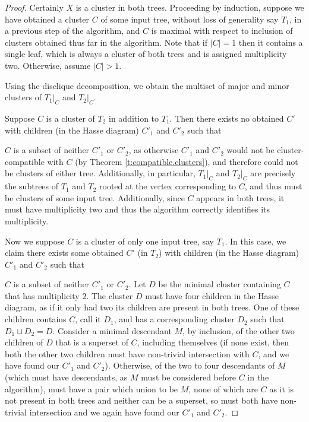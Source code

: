 \documentclass[12pt]{article}
\theoremstyle{definition}
\begin{document}
\begin{proof}
  Certainly $X$ is a cluster in both trees. Proceeding by induction, suppose we have obtained a cluster $C$ of some input tree, without loss of generality say $T_1$, in a previous step of the algorithm, and $C$ is maximal with respect to inclusion of clusters obtained thus far in the algorithm. Note that if $|C|=1$ then it contains a single leaf, which is always a cluster of both trees and is assigned multiplicity two. Otherwise, assume $|C|>1$.
  
  Using the disclique decomposition, we obtain the multiset of major and minor clusters of $T_1|_C$ and $T_2|_C$. 
  
  Suppose $C$ is a cluster of $T_2$ in addition to $T_1$. Then there exists no obtained $C'$ with children (in the Hasse diagram) $C'_1$ and $C'_2$ such that 
  
  $C$ is a subset of neither $C'_1$ or $C'_2$, as otherwise $C'_1$ and $C'_2$ would not be cluster-compatible with $C$ (by Theorem \ref{t:compatible.clusters}), and therefore could not be clusters of either tree. Additionally, in particular, $T_1|_C$ and $T_2|_C$ are precisely the subtrees of $T_1$ and $T_2$ rooted at the vertex corresponding to $C$, and thus must be clusters of some input tree. Additionally, since $C$ appears in both trees, it must have multiplicity two and thus the algorithm correctly identifies its multiplicity. 

  Now we suppose $C$ is a cluster of only one input tree, say $T_1$. In this case, we claim there exists some obtained $C'$ (in $T_2$) with children (in the Hasse diagram) $C'_1$ and $C'_2$ such that 
  
  $C$ is a subset of neither $C'_1$ or $C'_2$. Let $D$ be the minimal cluster containing $C$ that has multiplicity $2$. The cluster $D$ must have four children in the Hasse diagram, as if it only had two its children are present in both trees. One of these children contains $C$, call it $D_1$, and has a corresponding cluster $D_2$ such that $D_1 \sqcup D_2 = D$. Consider a minimal descendant $M$, by inclusion, of the other two children of $D$ that is a superset of $C$, including themselves (if none exist, then both the other two children must have non-trivial intersection with $C$, and we have found our $C'_1$ and $C'_2$). Otherwise, of the two to four descendants of $M$ (which must have descendants, as $M$ must be considered before $C$ in the algorithm), must have a pair which union to be $M$, none of which are $C$ as it is not present in both trees and neither can be a superset, so must both have non-trivial intersection and we again have found our $C'_1$ and $C'_2$.


\end{proof}
\end{document}
